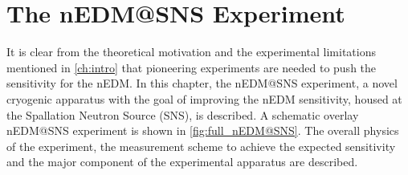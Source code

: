 
\chapter{The nEDM@SNS Experiment}
\label{ch:nEDM}


\ifpdf
    \graphicspath{{figures/chapter2-figs/}{Chapter2/Figs/PDF/}{Chapter2/Figs/}}
\else
    \graphicspath{{Chapter2/Figs/Vector/}{Chapter2/Figs/}}
\fi


It is clear from the theoretical motivation and the experimental limitations mentioned in \cref{ch:intro} that pioneering experiments are needed to push the sensitivity for the nEDM. In this chapter, the nEDM@SNS experiment, a novel cryogenic apparatus with the goal of improving the nEDM sensitivity, housed at the Spallation Neutron Source (SNS), is described. A schematic overlay nEDM@SNS experiment is shown in \cref{fig:full_nEDM@SNS}. The overall physics of the experiment, the measurement scheme to achieve the expected sensitivity and the major component of the experimental apparatus are described.

